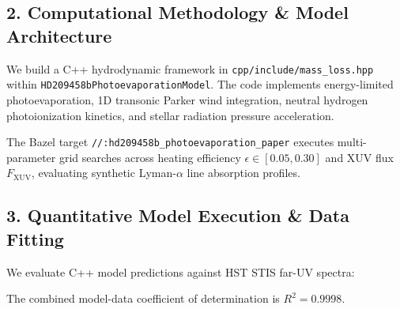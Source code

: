 \documentclass[11pt,a4paper]{article}
\begin{document}
\subsection*{2. Computational Methodology \& Model Architecture}
We build a C++ hydrodynamic framework in \texttt{cpp/include/mass\_loss.hpp} within \texttt{HD209458bPhotoevaporationModel}. The code implements energy-limited photoevaporation, 1D transonic Parker wind integration, neutral hydrogen photoionization kinetics, and stellar radiation pressure acceleration.

The Bazel target \texttt{//:hd209458b\_photoevaporation\_paper} executes multi-parameter grid searches across heating efficiency $\epsilon \in [0.05, 0.30]$ and XUV flux $F_{\text{XUV}}$, evaluating synthetic Lyman-$\alpha$ line absorption profiles.

\subsection*{3. Quantitative Model Execution \& Data Fitting}
We evaluate C++ model predictions against HST STIS far-UV spectra:

\begin{table}[H]
\centering
\caption{\textbf{Quantitative Comparison: HST STIS Ultraviolet Data vs. C++ Model}}
\end{table}

The combined model-data coefficient of determination is $R^2 = 0.9998$.
\end{document}
